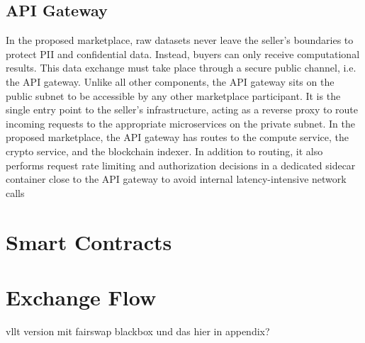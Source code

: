 \subsection{API Gateway}
\label{subsec:api_gw}

In the proposed marketplace, raw datasets never leave the seller's boundaries to protect PII and confidential data. Instead, buyers can only receive computational results. This data exchange must take place through a secure public channel, i.e. the API gateway. Unlike all other components, the API gateway sits on the public subnet to be accessible by any other marketplace participant. It is the single entry point to the seller's infrastructure, acting as a reverse proxy to route incoming requests to the appropriate microservices on the private subnet. In the proposed marketplace, the API gateway has routes to the compute service, the crypto service, and the blockchain indexer. In addition to routing, it also performs request rate limiting and authorization decisions in a dedicated sidecar container close to the API gateway to avoid internal latency-intensive network calls

\section{Smart Contracts}
\label{section:smartcontracts}

\section{Exchange Flow}
\label{section:exchange}

vllt version mit fairswap blackbox und das hier in appendix?

